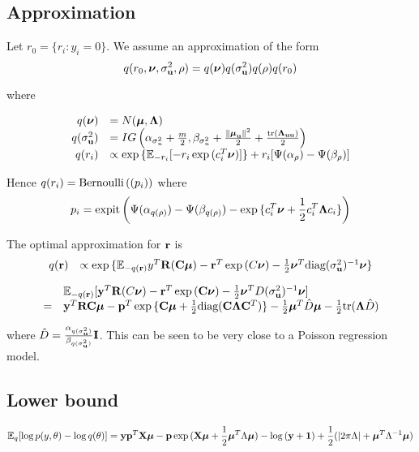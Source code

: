 \documentclass{amsart}
\begin{document}
\subsection{Approximation}
Let $r_0 = \{ r_i : y_i = 0 \}$.
We assume an approximation of the form
$$
q(r_0, {\boldsymbol \nu}, \sigma_{{\bf u}}^2, \rho) = q({\boldsymbol \nu}) q(\sigma_{{\bf u}}^2) q(\rho) q(r_0) \\
$$

where

$$
\begin{array}{rl}
q({\boldsymbol \nu}) &= N({\boldsymbol \mu}, {\boldsymbol \Lambda}) \\
q(\sigma_{{\bf u}}^2) &= IG\left(\alpha_{\sigma_u^2} + \frac{m}{2}, \beta_{\sigma_u^2} + \frac{\|{\boldsymbol \mu}_{\bf u}\|^2}{2} + \frac{\text{tr}({\boldsymbol \Lambda}_{{\bf u}{\bf u}})}{2}\right) \\
q(r_i) &\propto \exp{\{{\mathbb E}_{-r_i} [-r_i \exp{(c_i^T{\boldsymbol\nu})}]\} + r_i [\Psi(\alpha_\rho) - \Psi(\beta_\rho)]} \\
\end{array}
$$

Hence $q(r_i) = {\text{Bernoulli} \left( (p_i) \right)}$ where
$$
p_i = {\text{expit} \left( \Psi{(\alpha_{q(\rho)})} - \Psi{(\beta_{q(\rho)})} - \exp{\{c_i^T{\boldsymbol\nu}+ {\frac{1}{2}}c_i^T {\boldsymbol\Lambda}c_i\}} \right)}
$$

The optimal approximation for ${\bf r}$ is
$$
\begin{array}{ll}
q({\bf r}) &\propto \exp{\{{\mathbb E}_{-q({\bf r})}y^T{\bf R}({\bf C}{\boldsymbol\mu}) - {\bf r}^T\exp{(C{\boldsymbol\nu})}-{\frac{1}{2}}{\boldsymbol\nu}^T \text{diag}(\sigma_{{\bf u}}^2)^{-1} {\boldsymbol\nu}\}}
\end{array}
$$

$$
\begin{array}{ll}
&{\mathbb E}_{-q({\bf r})} [{\bf y}^T{\bf R}(C{\boldsymbol \nu}) - {\bf r}^T\exp{({\bf C}{\boldsymbol\nu})}-{\frac{1}{2}} {\boldsymbol \nu}^T D(\sigma_{{\bf u}}^2)^{-1} {\boldsymbol \nu}]\\
=&{\bf y}^T{\bf R}{\bf C} {\boldsymbol \mu} - {\bf p}^T \exp{\{{\bf C}{\boldsymbol\mu}+ {\frac{1}{2}}\text{diag}({\bf C}{\boldsymbol\Lambda}{\bf C}^T)\}} - {\frac{1}{2}} {\boldsymbol \mu}^T \hat{D} {\boldsymbol \mu} - {\frac{1}{2}} \text{tr}({\boldsymbol \Lambda} \hat{D})
\end{array}
$$

where $\hat{D} = \frac{\alpha_{q(\sigma_{{\bf u}}^2)}}{\beta_{q(\sigma_{{\bf u}}^2)}} {\bf I}$. This can be seen to be very close to a Poisson
regression model.

\subsection{Lower bound}
$$
{\mathbb E}_q [\log{p(y, \theta)} - \log{q(\theta)}] = {\bf y} {\bf p}^T {\bf X}{\boldsymbol \mu} - {\bf p} \exp{({\bf X}{\boldsymbol\mu}+ {\frac{1}{2}}{\boldsymbol\mu}^T \Lambda {\boldsymbol\mu})} - \log{({\bf y}+ {\bf1})}
+ {\frac{1}{2}} (|2\pi \Lambda| + {\boldsymbol \mu}^T \Lambda^{-1} {\boldsymbol \mu})
$$
\end{document}
